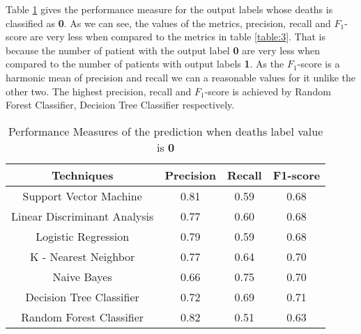 \documentclass[conference]{IEEEtran}
\begin{document}
Table \ref{table:2} gives the performance measure for the output labels whose deaths is classified as \textbf{0}. As we can see, the values of the metrics, precision, recall and $F_1$-score are very less when compared to the metrics in table \ref{table:3}. That is because the number of patient with the output label \textbf{0} are very less when compared to the number of patients with output labels \textbf{1}. As the  $F_1$-score is a harmonic mean of precision and recall we can a reasonable values for it unlike the other two. The highest precision, recall and $F_1$-score is achieved by Random Forest Classifier, Decision Tree Classifier respectively. 
\begin{table}[H]
\centering
 \begin{tabular}{|c| c c c|} 
 \hline
 Techniques  & Precision & Recall & F1-score \\ [0.5ex] 
 \hline
 Support Vector Machine & 0.81 & 0.59 & 0.68 \\ 
 \hline
 Linear Discriminant Analysis & 0.77 & 0.60 & 0.68\\
 \hline
 Logistic Regression & 0.79 & 0.59 & 0.68\\
 \hline
 K - Nearest Neighbor & 0.77 & 0.64 & 0.70\\
 \hline
 Naive Bayes & 0.66 & 0.75 & 0.70\\  
 \hline
 Decision Tree Classifier & 0.72 & 0.69 & 0.71 \\
 \hline
 Random Forest Classifier & 0.82 & 0.51 & 0.63  \\[0.75ex] 
 \hline
\end{tabular}
\vspace*{0.25cm}
\caption{Performance Measures of the prediction when deaths label value is \textbf{0}}
\label{table:2}
\end{table}
\end{document}
